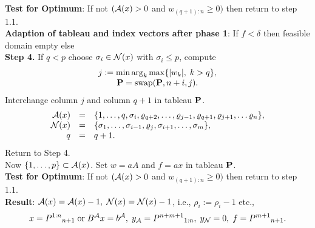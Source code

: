 {\bf Test for Optimum}:
If not $(\A(x) > 0$ and  $w_{(q+1):n} \geq 0)$ then
return to step 1.1.\\
{\bf Adaption of tableau and index vectors after phase 1}:
If $f < \delta $ then feasible domain empty else\\
{\bf Step 4.}
If $q < p$ choose $\sigma _i \in \N(x)$ with $\sigma _i \leq p$, compute
\[\ba{.}{c}
j := \min \arg_k \max \{|w_k|, \; k > q\},\\
{\bf P} = \mbox{swap}({\bf P},n+i,j).
\ea{.}
\]
\hspace*{1cm}Interchange column $j$ and column $q+1$ in tableau ${\bf P}$.
%
\[ \ba{.}{rcl}
\A(x)  &=& \{1,\ldots,q,\sigma _i,\rho_{q+2} , \ldots , \rho_{j -
  1},\rho _{q+1},\rho_{j +1} , \ldots \rho_n\},\\
\N (x) &=& \{\sigma _1, \ldots,\sigma _{i-1},\rho _j,\sigma _{i+1},
\ldots, \sigma _m\},\\
q &=& q + 1.
\ea{.}
\]
Return to Step 4.\\
Now $\{1,\ldots, p\} \subset \A(x)$.
Set $w = aA$ and $f = ax$ in tableau ${\bf P}$.\\
{\bf Test for Optimum}:
If not $(\A(x) > 0$ and $w_{(q+1):n} \geq 0)$ then
return to step 1.1.\\
{\bf Result}:
$\A (x) = \A(x) - 1, \;\N(x) = \N(x) - 1$, i.e., $\rho _i := \rho _i - 1$
etc.,
%
\[
x = P^{1:n}{}_{n+1} \; \mbox{or} \; B^{\A}x = b^{\A}, \;
y_{\A} = P^{n+m+1}{}_{1:n}, \; y_{\N} = 0, \;
f = P^{m+1}{}_{n+1}.
\]

